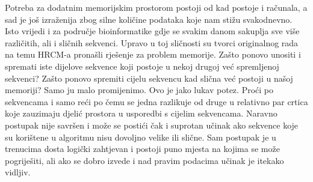 Potreba za dodatnim memorijskim prostorom postoji od kad postoje i računala, a sad je još izraženija zbog silne količine podataka koje nam stižu svakodnevno. Isto vrijedi i za područje bioinformatike gdje se svakim danom sakuplja sve više različitih, ali i sličnih sekvenci. Upravo u toj sličnosti su tvorci originalnog rada na temu HRCM-a pronašli rješenje za problem memorije. Zašto ponovo unositi i spremati iste dijelove sekvence koji postoje u nekoj drugoj već spremljenoj sekvenci? Zašto ponovo spremiti cijelu sekvencu kad slična već postoji u našoj memoriji? Samo ju malo promijenimo. Ovo je jako lukav potez. Proći po sekvencama i samo reći po čemu se jedna razlikuje od druge u relativno par crtica koje zauzimaju djelić prostora u usporedbi s cijelim sekvencama. Naravno postupak nije savršen i može se postići čak i suprotan učinak ako sekvence koje su korištene u algoritmu nisu dovoljno velike ili slične. Sam postupak je u trenucima dosta logički zahtjevan i postoji puno mjesta na kojima se može pogriješiti, ali ako se dobro izvede i nad pravim podacima učinak je itekako vidljiv. 